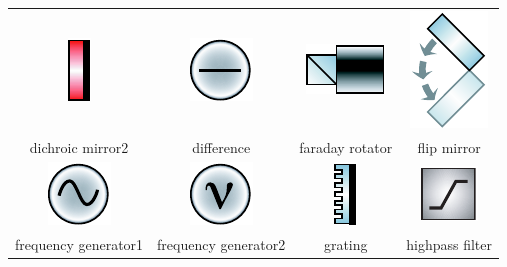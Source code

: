 \begin{table}
\begin{tabular}{|c|c|c|c|}
\includegraphics{contrib/optics_components/dichroic_mirror2} & 
\includegraphics{contrib/optics_components/difference} &
\includegraphics{contrib/optics_components/faraday_rotator} &
\includegraphics{contrib/optics_components/flip_mirror}\\
\tiny dichroic mirror2 & 
\tiny difference &
\tiny faraday rotator &
\tiny flip mirror\\
\hline

\includegraphics{contrib/optics_components/frequency_generator1} & 
\includegraphics{contrib/optics_components/frequency_generator2} & 
\includegraphics{contrib/optics_components/grating} &
\includegraphics{contrib/optics_components/highpass_filter}\\
\tiny frequency generator1 & 
\tiny frequency generator2 & 
\tiny grating &
\tiny highpass filter\\
\hline


\end{tabular}
\end{table}
